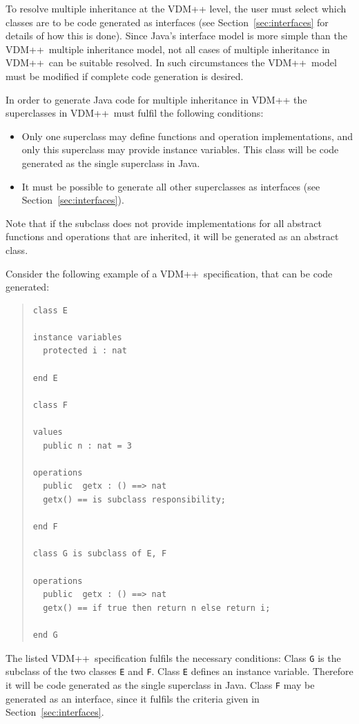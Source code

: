\documentclass[\pformat,11pt]{article}
\newcommand{\VDM}{VDM++}
\begin{document}
To resolve multiple inheritance at the VDM++ level, the user must
select which classes are to be code generated as interfaces (see
Section~\ref{sec:interfaces} for details of how this is done).
Since Java's interface model is more simple than the \VDM\ multiple
inheritance model, not all cases of multiple inheritance in \VDM\ can
be suitable resolved. In such circumstances the \VDM\ model must be
modified if complete code generation is desired. 

In order to generate Java
code for multiple inheritance in \VDM{} the superclasses in \VDM\ 
must fulfil the following conditions:

\begin{itemize}
\item Only one superclass may define functions and operation
  implementations, and only this superclass may provide instance
  variables. This class will be code generated as the single
  superclass in Java. 
\item It must be possible to generate all other superclasses as
  interfaces (see Section~\ref{sec:interfaces}).
\end{itemize}
Note that if the subclass does not provide implementations for all
abstract functions and operations that are inherited, it will be
generated as an abstract class.

Consider the following example of a \VDM\ specification, that can be
code generated: 

\begin{quote}
\begin{small}
\begin{verbatim}
class E

instance variables
  protected i : nat

end E

class F

values
  public n : nat = 3

operations
  public  getx : () ==> nat
  getx() == is subclass responsibility;

end F

class G is subclass of E, F

operations
  public  getx : () ==> nat
  getx() == if true then return n else return i;

end G
\end{verbatim}
\end{small}
\end{quote}

The listed \VDM\ specification fulfils the necessary conditions:
Class {\tt G} is the subclass of the two classes {\tt E} and {\tt F}.
Class {\tt E} defines an instance variable. Therefore it will be code
generated as the single superclass in Java. Class {\tt F} may be
generated as an interface, since it fulfils the criteria given in
Section~\ref{sec:interfaces}. 
\end{document}
